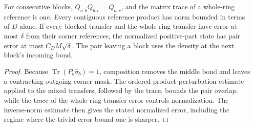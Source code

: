 \begin{lemma}
    \label{thm:ldp_rectangular_error}
    \leanok
    For consecutive blocks, $Q_{a:b}Q_{b:c}=Q_{a:c}$, and the matrix
    trace of a whole-ring reference is one. Every contiguous reference
    product has norm bounded in terms of $D$ alone.
    If every blocked transfer and the whole-ring transfer have error
    at most $\delta$ from their corner references, the normalized
    positive-part state has pair error at most $C_DM\sqrt\delta$.
    The pair leaving a block uses the density at the next block's
    incoming bond.
\end{lemma}
\begin{proof}\leanok
    Because $\operatorname{Tr}(P_b\widehat\sigma_b)=1$, composition removes
    the middle bond and leaves a contracting outgoing-corner mask. The
    ordered-product perturbation estimate applied to the mixed transfers,
    followed by the trace, bounds the pair overlap, while the trace of the
    whole-ring transfer error controls normalization. The inverse-norm
    estimate then gives the stated normalized error, including the regime
    where the trivial error bound one is sharper.
\end{proof}

